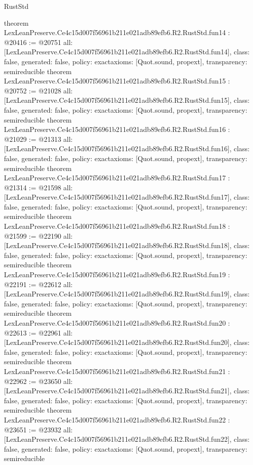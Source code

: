 \begin{lexlean}{RustStd}
\begin{coremodule}
{}
theorem LexLeanPreserve.Ce4c15d007f56961b211e021adb89efb6.R2.RustStd.fun14 : @20416 := @20751 {
  all: [LexLeanPreserve.Ce4c15d007f56961b211e021adb89efb6.R2.RustStd.fun14],
  class: false,
  generated: false,
  policy: exact{axioms: [Quot.sound, propext]},
  transparency: semireducible
}
theorem LexLeanPreserve.Ce4c15d007f56961b211e021adb89efb6.R2.RustStd.fun15 : @20752 := @21028 {
  all: [LexLeanPreserve.Ce4c15d007f56961b211e021adb89efb6.R2.RustStd.fun15],
  class: false,
  generated: false,
  policy: exact{axioms: [Quot.sound, propext]},
  transparency: semireducible
}
theorem LexLeanPreserve.Ce4c15d007f56961b211e021adb89efb6.R2.RustStd.fun16 : @21029 := @21313 {
  all: [LexLeanPreserve.Ce4c15d007f56961b211e021adb89efb6.R2.RustStd.fun16],
  class: false,
  generated: false,
  policy: exact{axioms: [Quot.sound, propext]},
  transparency: semireducible
}
theorem LexLeanPreserve.Ce4c15d007f56961b211e021adb89efb6.R2.RustStd.fun17 : @21314 := @21598 {
  all: [LexLeanPreserve.Ce4c15d007f56961b211e021adb89efb6.R2.RustStd.fun17],
  class: false,
  generated: false,
  policy: exact{axioms: [Quot.sound, propext]},
  transparency: semireducible
}
theorem LexLeanPreserve.Ce4c15d007f56961b211e021adb89efb6.R2.RustStd.fun18 : @21599 := @22190 {
  all: [LexLeanPreserve.Ce4c15d007f56961b211e021adb89efb6.R2.RustStd.fun18],
  class: false,
  generated: false,
  policy: exact{axioms: [Quot.sound, propext]},
  transparency: semireducible
}
theorem LexLeanPreserve.Ce4c15d007f56961b211e021adb89efb6.R2.RustStd.fun19 : @22191 := @22612 {
  all: [LexLeanPreserve.Ce4c15d007f56961b211e021adb89efb6.R2.RustStd.fun19],
  class: false,
  generated: false,
  policy: exact{axioms: [Quot.sound, propext]},
  transparency: semireducible
}
theorem LexLeanPreserve.Ce4c15d007f56961b211e021adb89efb6.R2.RustStd.fun20 : @22613 := @22961 {
  all: [LexLeanPreserve.Ce4c15d007f56961b211e021adb89efb6.R2.RustStd.fun20],
  class: false,
  generated: false,
  policy: exact{axioms: [Quot.sound, propext]},
  transparency: semireducible
}
theorem LexLeanPreserve.Ce4c15d007f56961b211e021adb89efb6.R2.RustStd.fun21 : @22962 := @23650 {
  all: [LexLeanPreserve.Ce4c15d007f56961b211e021adb89efb6.R2.RustStd.fun21],
  class: false,
  generated: false,
  policy: exact{axioms: [Quot.sound, propext]},
  transparency: semireducible
}
theorem LexLeanPreserve.Ce4c15d007f56961b211e021adb89efb6.R2.RustStd.fun22 : @23651 := @23932 {
  all: [LexLeanPreserve.Ce4c15d007f56961b211e021adb89efb6.R2.RustStd.fun22],
  class: false,
  generated: false,
  policy: exact{axioms: [Quot.sound, propext]},
  transparency: semireducible
}
\end{coremodule}
\end{lexlean}
